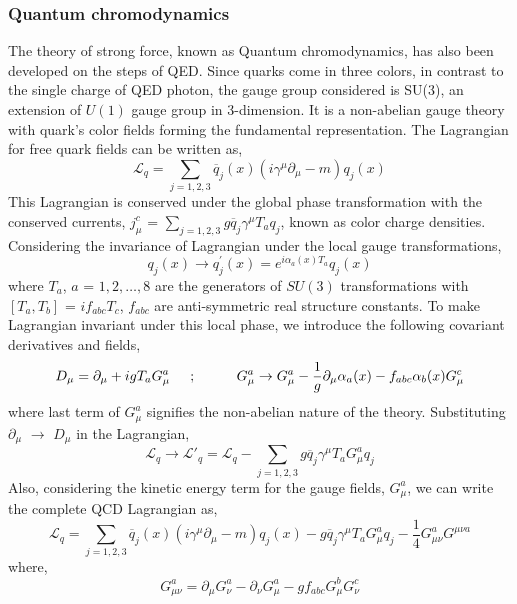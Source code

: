 \subsubsection{Quantum chromodynamics}
The theory of strong force, known as Quantum chromodynamics, has also been developed on the steps of QED. Since quarks come in three colors, in contrast to the single
charge of QED photon, the gauge group considered is SU(3), an extension of $U(1)$ gauge group in 3-dimension. It is a non-abelian gauge theory
with quark's color fields forming the fundamental representation. The Lagrangian for free quark fields can be written as,
\begin{equation}
\mathcal{L}_{q} = \sum_{j = 1,2,3} \overline{q}_{j}(x)(i\gamma^{\mu}\partial_{\mu} - m){q_{j}}(x)
\label{eq:QCDLang}
\end{equation}
This Lagrangian is conserved under the global phase transformation with the conserved currents, $j_{\mu}^{c}$ = $\sum_{j = 1,2,3} g\overline{q}_{j}\gamma^{\mu}T_{a}q_{j}$,
known as color charge densities. Considering the invariance of Lagrangian under the local gauge transformations,
\begin{equation}
q_{j}(x) \rightarrow q_{j}^{\prime}(x) = e^{i{\alpha}_{a}(x)T_{a}}q_{j}(x) 
\label{eg:QCDLocalphase}
\end{equation}
where $T_{a}$, $a$ = $1,2,\ldots,8$ are the generators of $SU(3)$ transformations with $[T_{a}, T_{b}]$ = $if_{abc}T_{c}$, $f_{abc}$ are anti-symmetric
real structure constants. To make Lagrangian invariant under this local phase, we introduce the 
following covariant derivatives and fields,
\begin{equation}
  D_{\mu} = \partial_{\mu} + igT_{a}G_{\mu}^{a} \hspace{0.2 in} ; \hspace{0.4 in} G_{\mu}^{a} \rightarrow G_{\mu}^{a} - \frac{1}{g}\partial_{\mu}\alpha_{a}(x) -
  f_{abc}\alpha_{b}(x)G_{\mu}^{c} 
\label{eg:QCDdelToD}
\end{equation}
where last term of $G_{\mu}^{a}$ signifies the non-abelian nature of the theory. Substituting $\partial_{\mu}$ $\rightarrow$ $D_{\mu}$ in the Lagrangian,
\begin{equation}
\mathcal{L}_{q} \rightarrow \mathcal{L}'_{q} = \mathcal{L}_{q} - \sum_{j = 1,2,3} g\overline{q}_{j}\gamma^{\mu}T_{a}G_{\mu}^{a}{q_{j}} 
  \label{eq:QCDLang_Dmu}
\end{equation}
Also, considering the kinetic energy term for the gauge fields, $G_{\mu}^{a}$, we can write the complete QCD Lagrangian as,
\begin{equation}
  \mathcal{L}_{q} = \sum_{j = 1,2,3} \overline{q}_{j}(x)(i\gamma^{\mu}\partial_{\mu} - m){q_{j}}(x) - g\overline{q}_{j}\gamma^{\mu}T_{a}G_{\mu}^{a}{q_{j}} -
  \frac{1}{4}G_{\mu\nu}^{a}G^{{\mu\nu}a}
  \label{eq:QCDLang_final}
\end{equation}
where,
\begin{equation}
  G_{\mu\nu}^{a} = \partial_{\mu}G_{\nu}^{a} - \partial_{\nu}G_{\mu}^{a} - gf_{abc}G_{\mu}^{b}G_{\nu}^{c}
  \label{eq:Gmunu_QCD}
\end{equation}

